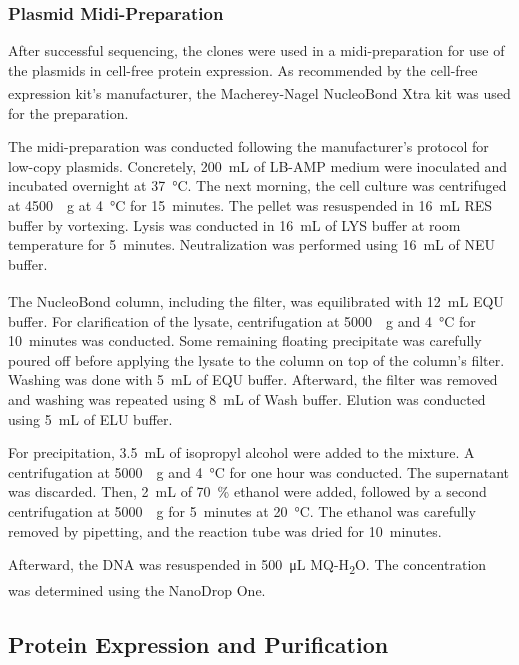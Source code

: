 \subsubsection{Plasmid Midi-Preparation}
After successful sequencing, the clones were used in a midi-preparation for use of the plasmids in cell-free protein expression. As recommended by the cell-free expression kit's manufacturer, the Macherey-Nagel\textsuperscript{\textregistered} NucleoBond\textsuperscript{\textregistered} Xtra kit was used for the preparation. 

The midi-preparation was conducted following the manufacturer's protocol for low-copy plasmids. Concretely, \SI{200}{\milli\liter} of LB-AMP medium were inoculated and incubated overnight at \SI{37}{\celsius}. The next morning, the cell culture was centrifuged at \SI{4500}{\times g} at \SI{4}{\celsius} for 15~minutes. The pellet was resuspended in \SI{16}{\milli\liter} RES buffer by vortexing. Lysis was conducted in \SI{16}{\milli\liter} of LYS buffer at room temperature for 5~minutes. Neutralization was performed using \SI{16}{\milli\liter} of NEU buffer. 

The NucleoBond\textsuperscript{\textregistered} column, including the filter, was equilibrated with \SI{12}{\milli\liter} EQU buffer. For clarification of the lysate, centrifugation at \SI{5000}{\times g} and \SI{4}{\celsius} for 10~minutes was conducted. Some remaining floating precipitate was carefully poured off before applying the lysate to the column on top of the column's filter. Washing was done with \SI{5}{\milli\liter} of EQU buffer. Afterward, the filter was removed and washing was repeated using \SI{8}{\milli\liter} of Wash buffer. Elution was conducted using \SI{5}{\milli\liter} of ELU buffer.

For precipitation, \SI{3.5}{\milli\liter} of isopropyl alcohol were added to the mixture. A centrifugation at \SI{5000}{\times g} and \SI{4}{\celsius} for one hour was conducted. The supernatant was discarded. Then, \SI{2}{\milli\liter} of \SI{70}{\percent} ethanol were added, followed by a second centrifugation at \SI{5000}{\times g} for 5~minutes at \SI{20}{\celsius}. The ethanol was carefully removed by pipetting, and the reaction tube was dried for 10~minutes. 

Afterward, the DNA was resuspended in \SI{500}{\micro\liter} MQ-H\textsubscript{2}O. The concentration was determined using the NanoDrop\textsuperscript{\texttrademark} One.

\subsection{Protein Expression and Purification}
